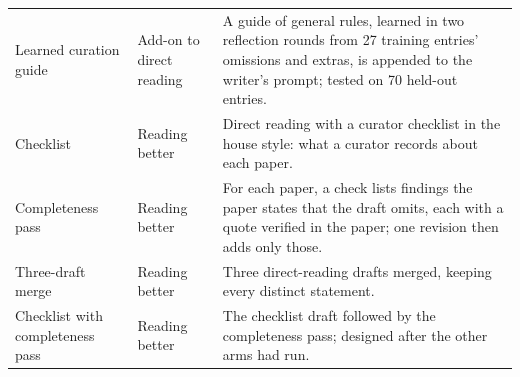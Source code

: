 \documentclass{article} %
\begin{document}
\begin{table}[!htbp]
\begin{tabularx}{\linewidth}{>{\raggedright\arraybackslash}p{2.4cm}>{\raggedright\arraybackslash}p{2.6cm}>{\raggedright\arraybackslash}X}
Learned curation guide & Add-on to direct reading & A guide of general rules, learned in two reflection rounds from 27 training entries' omissions and extras, is appended to the writer's prompt; tested on 70 held-out entries. \\
Checklist & Reading better & Direct reading with a curator checklist in the house style: what a curator records about each paper. \\
Completeness pass & Reading better & For each paper, a check lists findings the paper states that the draft omits, each with a quote verified in the paper; one revision then adds only those. \\
Three-draft merge & Reading better & Three direct-reading drafts merged, keeping every distinct statement. \\
Checklist with completeness pass & Reading better & The checklist draft followed by the completeness pass; designed after the other arms had run. \\
\bottomrule
\end{tabularx}
\end{table}

\FloatBarrier
\end{document}
